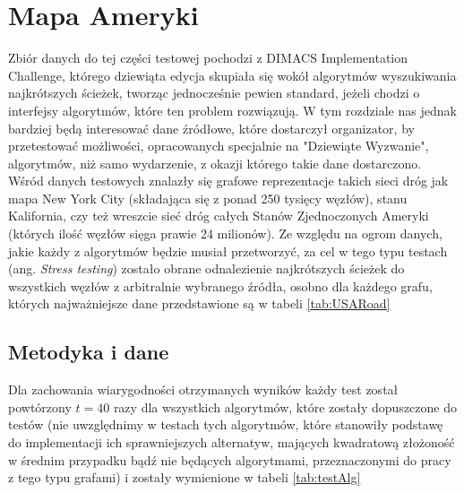 \section{Mapa Ameryki}

Zbiór danych do tej części testowej pochodzi z \textsf{DIMACS Implementation Challenge}, którego dziewiąta edycja skupiała się wokół algorytmów wyszukiwania najkrótszych ścieżek, tworząc jednocześnie pewien standard, jeżeli chodzi o interfejsy algorytmów, które ten problem rozwiązują. W tym rozdziale nas jednak bardziej będą interesować dane źródłowe, które dostarczył organizator, by przetestować możliwości, opracowanych specjalnie na "Dziewiąte Wyzwanie", algorytmów, niż samo wydarzenie, z okazji którego takie dane dostarczono. Wśród danych testowych znalazły się grafowe reprezentacje takich sieci dróg jak mapa New York City (składająca się z ponad 250 tysięcy węzłów), stanu Kalifornia, czy też wreszcie sieć dróg całych Stanów Zjednoczonych Ameryki (których ilość węzłów sięga prawie 24 milionów). Ze względu na ogrom danych, jakie każdy z algorytmów będzie musiał przetworzyć, za cel w tego typu testach (ang. \textit{Stress testing}) zostało obrane odnalezienie najkrótszych ścieżek do wszystkich węzłów z arbitralnie wybranego źródła, osobno dla każdego grafu, których najważniejsze dane przedstawione są w tabeli \ref{tab:USARoad}

\subsection{Metodyka i dane}

Dla zachowania wiarygodności otrzymanych wyników każdy test został powtórzony $t = 40$ razy dla wszystkich algorytmów, które zostały dopuszczone do testów (nie uwzględnimy w testach tych algorytmów, które stanowiły podstawę do implementacji ich sprawniejszych alternatyw, mających kwadratową złożoność w średnim przypadku bądź nie będących algorytmami, przeznaczonymi do pracy z tego typu grafami) i zostały wymienione w tabeli \ref{tab:testAlg}

